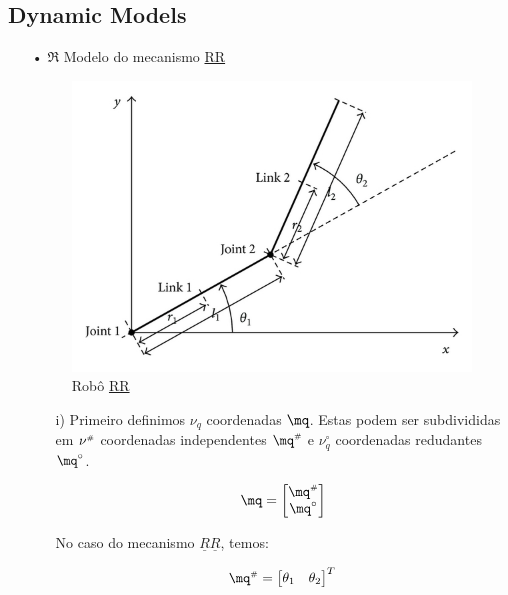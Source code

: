 \subsection{Dynamic Models}\label{S02-2}

\begin{itemize}
\item[•] $\mathbb{\Re}$ Modelo do mecanismo \underline{R}\underline{R}

\begin{figure}[h!]
	\centering
	\includegraphics[scale=1.5]{RR.jpg}  
	\caption{Rob\^o \underline{R}\underline{R}}
	\label{fig:figura2}
\end{figure}

	\begin{itemize}
	\item[i)] Primeiro definimos $\nu_q$ coordenadas  $\mq$. Estas podem ser subdivididas em $\nu^{\scriptscriptstyle \#}$ coordenadas independentes $\mq\ssh$ e $\nu_q^\circ$ 	coordenadas redudantes $\mq^\circ$.
	
	$$
	\mq = \begin{bmatrix}
	\mq\ssh \\
	\mq^\circ
	\end{bmatrix}
	$$

	No caso do mecanismo $\underline{R}\underline{R}$, temos:

	\begin{equation}
	\mq\ssh = \begin{bmatrix}
	\theta_1 & \theta_2
	\end{bmatrix}^T \\
	\end{equation}
	

\end{itemize}
\end{itemize}
